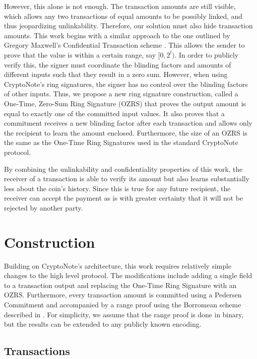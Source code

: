 \documentclass{article}
\begin{document}
However, this alone is not enough.  The transaction amounts are still visible,
which allows any two transactions of equal amounts to be possibly linked, and
thus jeopardizing unlinkability.  Therefore, our solution must also hide
transaction amounts.  This work begins with a similar approach to the one
outlined by Gregory Maxwell's Confidential Transaction scheme \cite{M15}.  This
allows the sender to prove that the value is within a certain range, say
$[0,2^l)$.  In order to publicly verify this, the signer must coordinate the
blinding factors and amounts of different inputs such that they result in a zero
sum.  However, when using CryptoNote's ring signatures, the signer has no
control over the blinding factors of other inputs.  Thus, we propose a new ring
signature construction, called a One-Time, Zero-Sum Ring Signature (OZRS) that
proves the output amount is equal to exactly one of the committed input values.
It also proves that a commitment receives a new blinding factor after each
transaction and allows only the recipient to learn the amount enclosed.
Furthermore, the size of an OZRS is the same as the One-Time Ring Signatures
used in the standard CryptoNote protocol.

By combining the unlinkability and confidentiality properties of this work, the
receiver of a transaction is able to verify its amount but also learns
substantially less about the coin's history.  Since this is true for any future
recipient, the receiver can accept the payment as is with greater certainty that
it will not be rejected by another party.

\section{Construction}

Building on CryptoNote's architecture, this work requires relatively simple
changes to the high level protocol.  The modifications include adding a single
field to a transaction output and replacing the One-Time Ring Signature with an
OZRS.  Furthermore, every transaction amount is committed using a Pedersen
Commitment and accompanied by a range proof using the Borromean scheme described
in \cite{MP15}.  For simplicity, we assume that the range proof is done in
binary, but the results can be extended to any publicly known encoding.

\subsection{Transactions}
\end{document}
